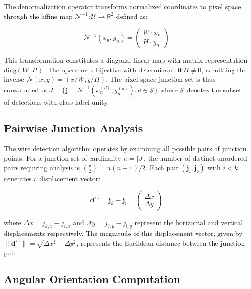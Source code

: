 The denormalization operator transforms normalized coordinates to pixel space through the affine map $\mathcal{N}^{-1} : \mathcal{U} \to \mathbb{R}^2$ defined as:

\begin{equation}
\mathcal{N}^{-1}(x_n, y_n) = \begin{pmatrix} W \cdot x_n \\ H \cdot y_n \end{pmatrix}
\label{eq:denormalization}
\end{equation}

This transformation constitutes a diagonal linear map with matrix representation $\text{diag}(W, H)$. The operator is bijective with determinant $WH \neq 0$, admitting the inverse $\mathcal{N}(x, y) = (x/W, y/H)$. The pixel-space junction set is thus constructed as $J = \{\mathbf{j} = \mathcal{N}^{-1}(x_n^{(d)}, y_n^{(d)}) : d \in \mathcal{J}\}$ where $\mathcal{J}$ denotes the subset of detections with class label unity.

\subsection{Pairwise Junction Analysis}

The wire detection algorithm operates by examining all possible pairs of junction points. For a junction set of cardinality $n = |J|$, the number of distinct unordered pairs requiring analysis is $\binom{n}{2} = n(n-1)/2$. Each pair $(\mathbf{j}_i, \mathbf{j}_k)$ with $i < k$ generates a displacement vector:

\begin{equation}
\mathbf{d}^{\leftrightarrow} = \mathbf{j}_k - \mathbf{j}_i = \begin{pmatrix} \Delta x \\ \Delta y \end{pmatrix}
\label{eq:displacement-vector}
\end{equation}

where $\Delta x = j_{k,x} - j_{i,x}$ and $\Delta y = j_{k,y} - j_{i,y}$ represent the horizontal and vertical displacements respectively. The magnitude of this displacement vector, given by $\|\mathbf{d}^{\leftrightarrow}\| = \sqrt{\Delta x^2 + \Delta y^2}$, represents the Euclidean distance between the junction pair.

\subsection{Angular Orientation Computation}

